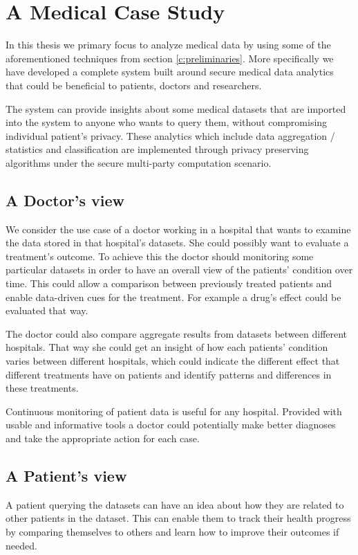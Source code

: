 \chapter{A Medical Case Study}\label{c:medical-study}

In this thesis we primary focus to analyze medical data by using some of the aforementioned techniques from section \ref{c:preliminaries}.
More specifically we have developed a complete system built around secure medical data analytics that could be beneficial to patients, doctors and researchers.

The system can provide insights about some medical datasets that are imported into the system to anyone who wants to query them, without compromising individual patient's privacy.
These analytics which include data aggregation / statistics and classification are implemented through privacy preserving algorithms under the secure multi-party computation scenario.

\section{A Doctor's view}
We consider the use case of a doctor working in a hospital that wants to examine the data stored in that hospital's datasets.
She could possibly want to evaluate a treatment's outcome.
To achieve this the doctor should monitoring some particular datasets in order to have an overall view of the patients' condition over time.
This could allow a comparison between previously treated patients and enable data\hyp driven cues for the treatment.
For example a drug's effect could be evaluated that way.

The doctor could also compare aggregate results from datasets between different hospitals.
That way she could get an insight of how each patients' condition varies between different hospitals, which could indicate the different effect that different treatments have on patients and identify patterns
and differences in these treatments.

Continuous monitoring of patient data is useful for any hospital.
Provided with usable and informative tools a doctor could potentially make better diagnoses and take the appropriate action for each case.

\section{A Patient's view}
A patient querying the datasets can have an idea about how they are related to other patients in the dataset.
This can enable them to track their health progress by comparing themselves to others and learn how to improve their outcomes if needed.

